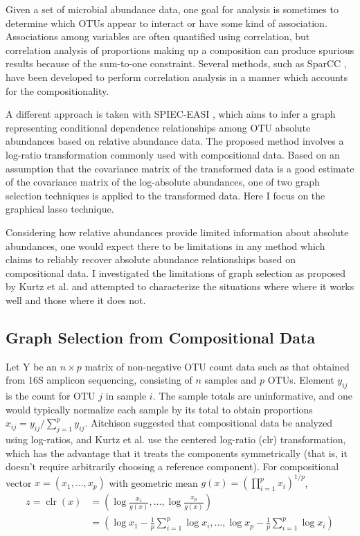 \documentclass[10pt]{article}
\newcommand{\clr}{\operatorname{clr}}
\begin{document}
Given a set of microbial abundance data, one goal for analysis is sometimes to determine which OTUs appear to interact or have some kind of association. Associations among variables are often quantified using correlation, but correlation analysis of proportions making up a composition can produce spurious results because of the sum-to-one constraint. Several methods, such as SparCC \cite{friedmanjon}, have been developed to perform correlation analysis in a manner which accounts for the compositionality.

A different approach is taken with SPIEC-EASI \cite{kurtz}, which aims to infer a graph representing conditional dependence relationships among OTU absolute abundances based on relative abundance data. The proposed method involves a log-ratio transformation commonly used with compositional data. Based on an assumption that the covariance matrix of the transformed data is a good estimate of the covariance matrix of the log-absolute abundances, one of two graph selection techniques is applied to the transformed data. Here I focus on the graphical lasso technique.

Considering how relative abundances provide limited information about absolute abundances, one would expect there to be limitations in any method which claims to reliably recover absolute abundance relationships based on compositional data. I investigated the limitations of graph selection as proposed by Kurtz et al. \citeyear{kurtz} and attempted to characterize the situations where where it works well and those where it does not.

\subsection*{Graph Selection from Compositional Data}

Let $\mathrm{Y}$ be an $n \times p$ matrix of non-negative OTU count data such as that obtained from 16S amplicon sequencing, consisting of $n$ samples and $p$ OTUs. Element $y_{ij}$ is the count for OTU $j$ in sample $i$. The sample totals are uninformative, and one would typically normalize each sample by its total to obtain proportions $x_{ij} = y_{ij} / \sum_{j=1}^p y_{ij}$. Aitchison \citeyear{aitchison} suggested that compositional data be analyzed using log-ratios, and Kurtz et al. \citeyear{kurtz} use the centered log-ratio (clr) transformation, which has the advantage that it treats the components symmetrically (that is, it doesn't require arbitrarily choosing a reference component). For compositional vector $x = (x_1, \dots, x_p)$ with geometric mean $g(x) = \left(\prod_{i=1}^p x_i\right)^{1/p}$,
\begin{equation}
\label{e:clr}
\begin{split}
z = \clr(x) &= \left( \log \frac{x_1}{g(x)}, \dots, \log \frac{x_p}{g(x)} \right) \\
&= \left( \log x_1 - \frac{1}{p} \sum_{i=1}^p \log x_i, \dots, \log x_p - \frac{1}{p} \sum_{i=1}^p \log x_i \right)
\end{split}
\end{equation}
\end{document}
